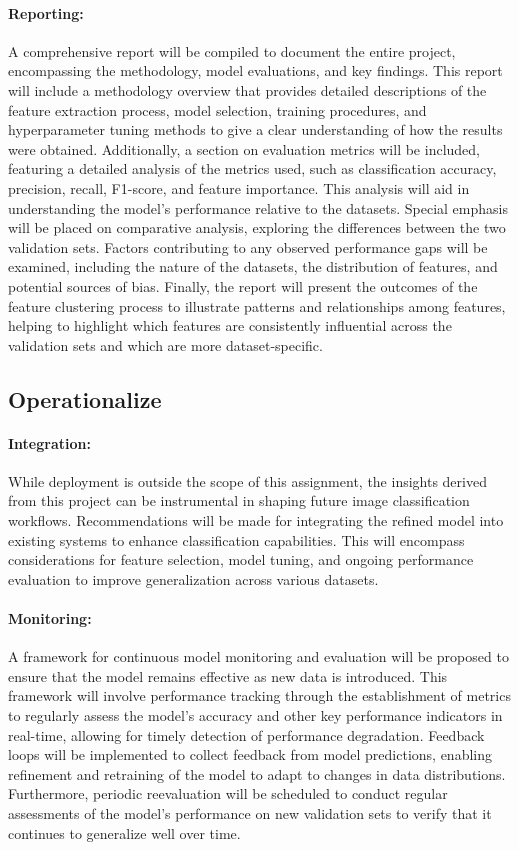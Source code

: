 \documentclass[a4paper,11pt]{article}
\begin{document}
\paragraph{Reporting:}  
A comprehensive report will be compiled to document the entire project, encompassing the methodology, model evaluations, and key findings. This report will include a methodology overview that provides detailed descriptions of the feature extraction process, model selection, training procedures, and hyperparameter tuning methods to give a clear understanding of how the results were obtained. Additionally, a section on evaluation metrics will be included, featuring a detailed analysis of the metrics used, such as classification accuracy, precision, recall, F1-score, and feature importance. This analysis will aid in understanding the model’s performance relative to the datasets. Special emphasis will be placed on comparative analysis, exploring the differences between the two validation sets. Factors contributing to any observed performance gaps will be examined, including the nature of the datasets, the distribution of features, and potential sources of bias. Finally, the report will present the outcomes of the feature clustering process to illustrate patterns and relationships among features, helping to highlight which features are consistently influential across the validation sets and which are more dataset-specific.

\subsection{Operationalize}

\paragraph{Integration:}  
While deployment is outside the scope of this assignment, the insights derived from this project can be instrumental in shaping future image classification workflows. Recommendations will be made for integrating the refined model into existing systems to enhance classification capabilities. This will encompass considerations for feature selection, model tuning, and ongoing performance evaluation to improve generalization across various datasets.

\paragraph{Monitoring:}  
A framework for continuous model monitoring and evaluation will be proposed to ensure that the model remains effective as new data is introduced. This framework will involve performance tracking through the establishment of metrics to regularly assess the model's accuracy and other key performance indicators in real-time, allowing for timely detection of performance degradation. Feedback loops will be implemented to collect feedback from model predictions, enabling refinement and retraining of the model to adapt to changes in data distributions. Furthermore, periodic reevaluation will be scheduled to conduct regular assessments of the model's performance on new validation sets to verify that it continues to generalize well over time.
\end{document}
